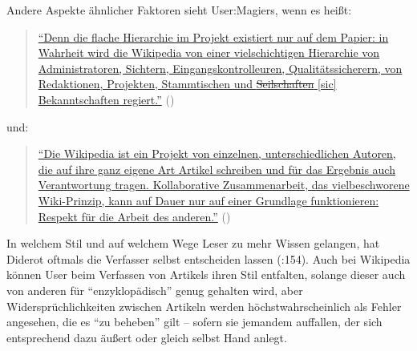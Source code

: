 \documentclass[fontsize=12pt]{scrartcl}
\begin{document}
Andere Aspekte \"ahnlicher Faktoren sieht \mbox{User}:Magiers, wenn es hei{\ss}t: 

\singlespacing
\begin{quote}
\href{https://de.wikipedia.org/w/index.php?title=Benutzer:Magiers/Wer_hat_Angst_vorm_Hauptautor\%3F&oldid=136460924#Platzhirsch_vs._Platzhirsch}{"`Denn die flache Hierarchie im Projekt existiert nur auf dem Papier: in Wahrheit wird die Wi\-ki\-pe\-dia von einer vielschichtigen Hierarchie von Administratoren, Sichtern, Ein\-gangs\-kon\-trol\-leu\-ren, Qua\-li\-t\"ats\-si\-che\-rern, von Re\-dak\-ti\-o\-nen, Pro\-jek\-ten, Stamm\-ti\-schen und \sout{Seilschaften} [sic] Be\-kannt\-schaf\-ten regiert."'} (\cite{UserMagiers2014b1})
\end{quote}
\onehalfspacing

und:

\singlespacing
\begin{quote}
\href{https://de.wikipedia.org/w/index.php?title=Benutzer:Magiers/Wer_hat_Angst_vorm_Hauptautor\%3F&oldid=136460924#Fazit}{"`Die Wi\-ki\-pe\-dia ist ein Projekt von einzelnen, unterschiedlichen Autoren, die auf ihre ganz eigene Art Artikel schrei\-ben und f\"ur das Ergebnis auch Verantwortung tragen. Kollaborative Zusammenarbeit, das vielbeschwo\-rene Wiki-Prinzip, kann auf Dauer nur auf einer Grundlage funktionieren: Respekt f\"ur die Arbeit des anderen."'} (\cite{UserMagiers2014b2})
\end{quote}
\onehalfspacing

In welchem Stil und auf welchem Wege Leser\textsuperscript{\tiny *} zu mehr Wissen gelangen, hat Diderot oftmals die Verfasser\textsuperscript{\tiny *} \mbox{selbst} entscheiden lassen (\cite{Blom2004}:154). Auch bei Wi\-ki\-pe\-dia k\"onnen \mbox{User} beim Verfassen von Artikels ihren Stil entfalten, solange dieser auch von anderen f\"ur "`enzyklop\"adisch"' genug gehalten wird, aber Widerspr\"uchlichkei\-ten zwischen Artikeln werden h\"ochstwahrscheinlich als Fehler angesehen, die es "`zu beheben"' gilt -- sofern sie jemandem auffallen, der sich entsprechend dazu \"au{\ss}ert oder gleich \mbox{selbst} Hand anlegt.
\end{document}
